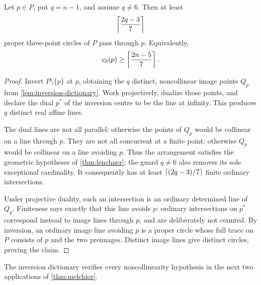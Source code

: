 \begin{corollary}\label{cor:pivot-lenchner}
Let \(p\in P\), put \(q=n-1\), and assume \(q\neq6\).  Then at least
\[
 \left\lceil \frac{2q-3}{7}\right\rceil
\]
proper three-point circles of \(P\) pass through \(p\).  Equivalently,
\[
 c_3(p)\geq\left\lceil \frac{2n-5}{7}\right\rceil.
\]
\end{corollary}

\begin{proof}
Invert \(P\setminus\{p\}\) at \(p\), obtaining the \(q\) distinct,
noncollinear image points \(Q_p\) from
\cref{lem:inversion-dictionary}.  Work projectively, dualize those points,
and declare the dual \(p^*\) of the inversion centre to be the line at
infinity.  This produces \(q\) distinct real affine lines.

The dual lines are not all parallel: otherwise the points of \(Q_p\)
would be collinear on a line through \(p\).  They are not all concurrent
at a finite point: otherwise \(Q_p\) would be collinear on a line avoiding
\(p\).  Thus the arrangement satisfies the geometric hypotheses of
\cref{thm:lenchner}; the guard \(q\neq6\) also removes its sole exceptional
cardinality.  It consequently has at least
\(\left\lceil (2q-3)/7\right\rceil\) finite ordinary intersections.

Under projective duality, such an intersection is an ordinary determined
line of \(Q_p\).  Finiteness says exactly that this line avoids \(p\):
ordinary intersections on \(p^*\) correspond instead to image lines
through \(p\), and are deliberately not counted.  By inversion, an ordinary
image line avoiding \(p\) is a proper circle whose full trace on \(P\)
consists of \(p\) and the two preimages.  Distinct image lines give distinct
circles, proving the claim.
\end{proof}

The inversion dictionary verifies every noncollinearity hypothesis in the next
two applications of \cref{thm:melchior}.

